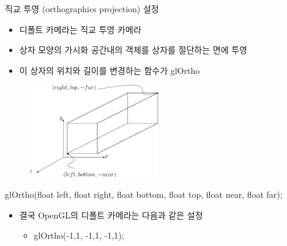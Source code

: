 \documentclass{beamer}
\begin{document}
\begin{frame}[fragile]{직교 투영 (orthographics projection) 설정}

\begin{itemize}
\item 디폴트 카메라는 직교 투영 카메라
\item 상자 모양의 가시화 공간내의 객체를 상자를 절단하는 면에 투영
\item 이 상자의 위치와 길이를 변경하는 함수가 glOrtho
\end{itemize}

\begin{figure}
    \includegraphics[height=4cm]{OGL_opengl/glOrtho.eps}
\end{figure}
\begin{center}{\tiny glOrtho(float left, float right, float bottom, float top, float near, float far);}
\end{center}

\begin{itemize}
\item 결국 OpenGL의 디폴트 카메라는 다음과 같은 설정
	\begin{itemize}
	\item glOrtho(-1,1, -1,1, -1,1);
	\end{itemize}
\end{itemize}

\end{frame}
\end{document}
